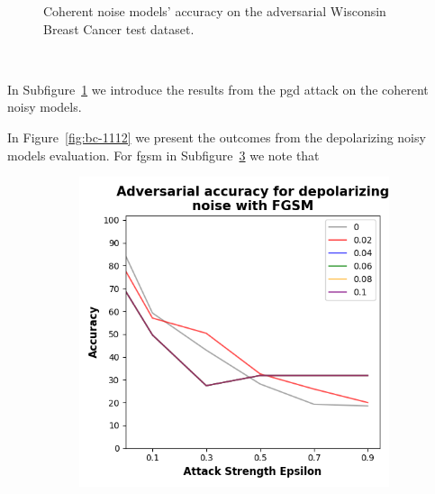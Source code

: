\begin{figure}[!h]
\begin{subfigure}{0.45\textwidth}
      \label{fig:bc10}
  \end{subfigure}
  \caption{Coherent noise models' accuracy on the adversarial Wisconsin Breast Cancer test dataset.}
  \label{fig:bc-910}
\end{figure} \

In Subfigure~\ref{fig:bc10} we introduce the results from the \ac{pgd}
attack on the coherent noisy models. \

In Figure~\ref{fig:bc-1112} we present the outcomes from the depolarizing
noisy models evaluation. For \ac{fgsm} in Subfigure~\ref{fig:bc11}
we note that \

\begin{figure}[!h]
  \centering

  \begin{subfigure}{0.45\textwidth}
      \includegraphics[width=\linewidth]{figures/evaluation_results/breast-cancer/pqc/figures/depolarizing-fgsm.png}
      \label{fig:bc11}
  \end{subfigure} \qquad
  \begin{subfigure}{0.45\textwidth}

\end{subfigure}
\end{figure}
